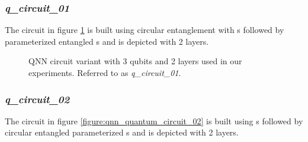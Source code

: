 
\subsubsection{\textit{q\_circuit\_01}}
\label{subsubsection:qnn_quantum_circuit_01}
The circuit in figure \ref{figure:qnn_quantum_circuit_01} is built using circular entanglement with \rygate s followed by parameterized entangled \crygate s and is depicted with 2 layers. 

\begin{figure}[!h]
	\centering
	\caption{QNN circuit variant with 3 qubits and 2 layers used in our experiments. Referred to as \textit{q\_circuit\_01}.}
	\label{figure:qnn_quantum_circuit_01}
\end{figure}

\subsubsection{\textit{q\_circuit\_02}}
\label{subsubsection:qnn_quantum_circuit_02}
The circuit in figure \ref{figure:qnn_quantum_circuit_02} is built using \rygate s followed by circular entangled parameterized \crygate s and is depicted with 2 layers.

